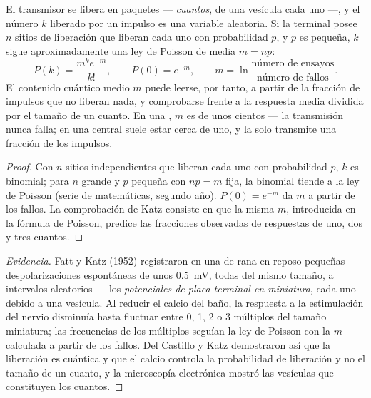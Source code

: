 \begin{theorem}\label{thm:b2:neurons-synapses:quantal}
El transmisor se libera en paquetes --- \emph{cuantos}, de una vesícula
cada uno ---, y el número $k$ liberado por un impulso es una variable
aleatoria. Si la terminal posee $n$ sitios de liberación que liberan cada
uno con probabilidad $p$, y $p$ es pequeña, $k$ sigue aproximadamente una
ley de Poisson de media $m = np$:
\[
P(k) = \frac{m^{k}e^{-m}}{k!}, \qquad P(0) = e^{-m}, \qquad
m = \ln\frac{\text{número de ensayos}}{\text{número de fallos}}.
\]
El contenido cuántico medio $m$ puede leerse, por tanto, a partir de la
fracción de impulsos que no liberan nada, y comprobarse frente a la
respuesta media dividida por el tamaño de un cuanto. En una , $m$ es de unos cientos --- la transmisión nunca falla; en
una  central suele estar cerca de uno, y la  solo
transmite una fracción de los impulsos.
\end{theorem}
\begin{proof}
Con $n$ sitios independientes que liberan cada uno con probabilidad $p$, $k$
es binomial; para $n$ grande y $p$ pequeña con $np = m$ fija, la binomial
tiende a la ley de Poisson (serie de matemáticas, segundo año).
$P(0) = e^{-m}$ da $m$ a partir de los fallos. La comprobación de Katz
consiste en que la misma $m$, introducida en la fórmula de Poisson,
predice las fracciones observadas de respuestas de uno, dos y tres cuantos.
\end{proof}
\begin{proof}[Evidencia]
Fatt y Katz (1952) registraron en una  de rana en reposo
pequeñas despolarizaciones espontáneas de unos \qty{0.5}{mV}, todas del
mismo tamaño, a intervalos aleatorios --- los \emph{potenciales de placa
terminal en miniatura}, cada uno debido a una vesícula. Al reducir el
calcio del baño, la respuesta a la estimulación del nervio disminuía hasta
fluctuar entre 0, 1, 2 o 3 múltiplos del tamaño miniatura; las
frecuencias de los múltiplos seguían la ley de Poisson con la
$m$ calculada a partir de los fallos. Del Castillo y Katz demostraron así
que la liberación es cuántica y que el calcio controla la probabilidad de
liberación y no el tamaño de un cuanto, y la microscopía electrónica
mostró las vesículas que constituyen los cuantos.
\end{proof}

